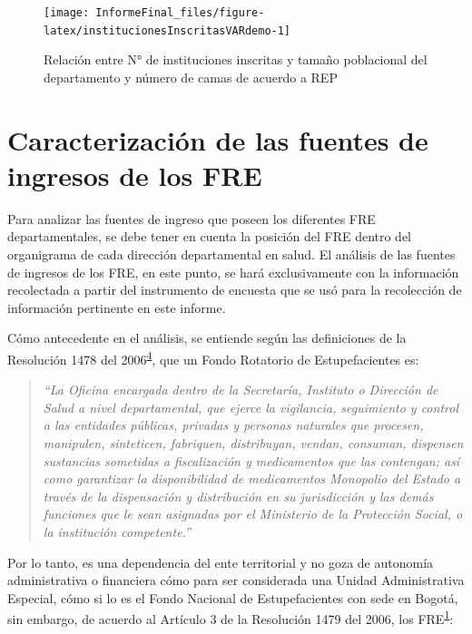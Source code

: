 \documentclass[
]{book}
\begin{document}
\begin{figure}

{\centering \texttt{[image: InformeFinal\_files/figure-latex/institucionesInscritasVARdemo-1]} 

}

\caption{Relación entre N° de instituciones inscritas y tamaño poblacional del departamento y número de camas de acuerdo a REP}\label{fig:institucionesInscritasVARdemo}
\end{figure}

\hypertarget{caracterizaciuxf3n-de-las-fuentes-de-ingresos-de-los-fre}{%
\section{Caracterización de las fuentes de ingresos de los FRE}\label{caracterizaciuxf3n-de-las-fuentes-de-ingresos-de-los-fre}}

Para analizar las fuentes de ingreso que poseen los diferentes FRE departamentales, se debe tener en cuenta la posición del FRE dentro del organigrama de cada dirección departamental en salud. El análisis de las fuentes de ingresos de los FRE, en este punto, se hará exclusivamente con la información recolectada a partir del instrumento de encuesta que se usó para la recolección de información pertinente en este informe.

Cómo antecedente en el análisis, se entiende según las definiciones de la Resolución 1478 del 2006\textsuperscript{\protect\hyperlink{ref-MSPS1478-2006}{4}}, que un Fondo Rotatorio de Estupefacientes es:

\begin{quote}
\emph{``La Oficina encargada dentro de la Secretaría, Instituto o Dirección de Salud a nivel departamental, que ejerce la vigilancia, seguimiento y control a las entidades públicas, privadas y personas naturales que procesen, manipulen, sinteticen, fabriquen, distribuyan, vendan, consuman, dispensen sustancias sometidas a fiscalización y medicamentos que las contengan; así como garantizar la disponibilidad de medicamentos Monopolio del Estado a través de la dispensación y distribución en su jurisdicción y las demás funciones que le sean asignadas por el Ministerio de la Protección Social, o la institución competente.''}
\end{quote}

Por lo tanto, es una dependencia del ente territorial y no goza de autonomía administrativa o financiera cómo para ser considerada una Unidad Administrativa Especial, cómo si lo es el Fondo Nacional de Estupefacientes con sede en Bogotá, sin embargo, de acuerdo al Artículo 3 de la Resolución 1479 del 2006, los FRE\textsuperscript{\protect\hyperlink{ref-MSPS1479-2006}{1}}:
\end{document}
